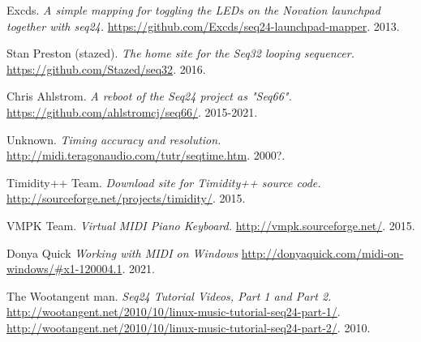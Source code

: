 {\begin{thebibliography}{99}
   Excds.
   \emph{A simple mapping for toggling the LEDs on the Novation launchpad
   together with seq24.}
   \url{https://github.com/Excds/seq24-launchpad-mapper}.
   2013.

   Stan Preston (stazed).
   \emph{The home site for the Seq32 looping sequencer.}
   \url{https://github.com/Stazed/seq32}.
   2016.

   Chris Ahlstrom.
   \emph{A reboot of the Seq24 project as "Seq66".}
   \url{https://github.com/ahlstromcj/seq66/}.
   2015-2021.

   Unknown.
   \emph{Timing accuracy and resolution.}
   \url{http://midi.teragonaudio.com/tutr/seqtime.htm}.
   2000?.

   Timidity++ Team.
   \emph{Download site for Timidity++ source code.}
   \url{http://sourceforge.net/projects/timidity/}.
   2015.

   VMPK Team.
   \emph{Virtual MIDI Piano Keyboard.}
   \url{http://vmpk.sourceforge.net/}.
   2015.

   Donya Quick
   \emph{Working with MIDI on Windows}
   \url{http://donyaquick.com/midi-on-windows/#x1-120004.1}.
   2021.

   The Wootangent man.
   \emph{Seq24 Tutorial Videos, Part 1 and Part 2.}
   \url{http://wootangent.net/2010/10/linux-music-tutorial-seq24-part-1/}.
   \url{http://wootangent.net/2010/10/linux-music-tutorial-seq24-part-2/}.
   2010.

\end{thebibliography}
}


